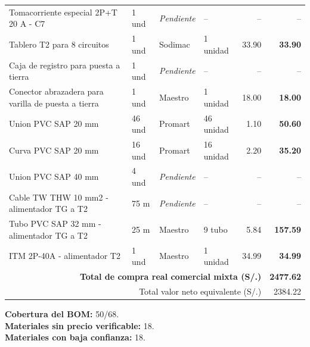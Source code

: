 \begin{longtable}{p{5.0cm} p{1.5cm} p{2.2cm} p{2.2cm} r r}
Tomacorriente especial 2P+T 20 A - C7 & 1 und & \textit{Pendiente} & -- & -- & -- \\
Tablero T2 para 8 circuitos & 1 und & Sodimac & 1 unidad & 33.90 & \textbf{33.90} \\
Caja de registro para puesta a tierra & 1 und & \textit{Pendiente} & -- & -- & -- \\
Conector abrazadera para varilla de puesta a tierra & 1 und & Maestro & 1 unidad & 18.00 & \textbf{18.00} \\
Union PVC SAP 20 mm & 46 und & Promart & 46 unidad & 1.10 & \textbf{50.60} \\
Curva PVC SAP 20 mm & 16 und & Promart & 16 unidad & 2.20 & \textbf{35.20} \\
Union PVC SAP 40 mm & 4 und & \textit{Pendiente} & -- & -- & -- \\
Cable TW THW 10 mm2 - alimentador TG a T2 & 75 m & \textit{Pendiente} & -- & -- & -- \\
Tubo PVC SAP 32 mm - alimentador TG a T2 & 25 m & Maestro & 9 tubo & 5.84 & \textbf{157.59} \\
ITM 2P-40A - alimentador T2 & 1 und & Maestro & 1 unidad & 34.99 & \textbf{34.99} \\
\midrule
\multicolumn{5}{r}{\textbf{Total de compra real comercial mixta (S/.)}} & \textbf{2477.62} \\
\multicolumn{5}{r}{Total valor neto equivalente (S/.)} & 2384.22 \\
\bottomrule
\end{longtable}

\noindent\textbf{Cobertura del BOM:} 50/68.\\
\textbf{Materiales sin precio verificable:} 18.\\
\textbf{Materiales con baja confianza:} 18.
